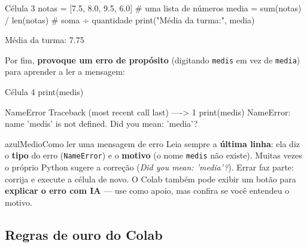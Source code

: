 \documentclass[11pt,a4paper]{article}
\newenvironment{conceito}[1]{\begin{destaque}{azulMedio}{\faBookOpen}{#1}}{\end{destaque}}
\newcommand{\circulo}[2][azul]{\tikz[baseline=(c.base)]\node[circle, fill=#1, text=white,
    inner sep=0pt, minimum size=1.35em, font=\footnotesize\bfseries](c){#2};}
\begin{document}
\begin{codigo}{Célula 3}
notas = [7.5, 8.0, 9.5, 6.0]          # uma lista de números
media = sum(notas) / len(notas)       # soma ÷ quantidade
print("Média da turma:", media)
\end{codigo}
\begin{saida}
Média da turma: 7.75
\end{saida}

\begin{enumerate}[label={\protect\circulo{\arabic*}}, start=7]
    \item Por fim, \textbf{provoque um erro de propósito} (digitando \texttt{medis} em vez de \texttt{media}) para aprender a ler a mensagem:
\end{enumerate}

\begin{codigo}{Célula 4}
print(medis)
\end{codigo}
\begin{saida}
NameError                                 Traceback (most recent call last)
----> 1 print(medis)
NameError: name 'medis' is not defined. Did you mean: 'media'?
\end{saida}

\begin{conceito}{Como ler uma mensagem de erro}
Leia sempre a \textbf{última linha}: ela diz o \textbf{tipo} do erro (\texttt{NameError}) e o \textbf{motivo} (o nome \texttt{medis} não existe). Muitas vezes o próprio Python sugere a correção (\textit{Did you mean: 'media'?}). Errar faz parte: corrija e execute a célula de novo. O Colab também pode exibir um botão para \textbf{explicar o erro com IA} --- use como apoio, mas confira se você entendeu o motivo.
\end{conceito}

\subsection{Regras de ouro do Colab}\label{sec:regras}
\end{document}
